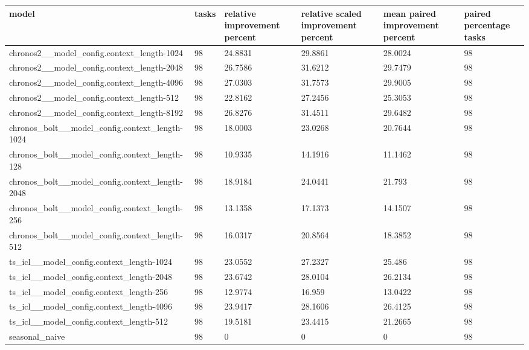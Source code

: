 \begin{tabular}{llllll}
\toprule
model & tasks & relative improvement percent & relative scaled improvement percent & mean paired improvement percent & paired percentage tasks \\
\midrule
chronos2\_\_model\_config.context\_length-1024 & 98 & 24.8831 & 29.8861 & 28.0024 & 98 \\
chronos2\_\_model\_config.context\_length-2048 & 98 & 26.7586 & 31.6212 & 29.7479 & 98 \\
chronos2\_\_model\_config.context\_length-4096 & 98 & 27.0303 & 31.7573 & 29.9005 & 98 \\
chronos2\_\_model\_config.context\_length-512 & 98 & 22.8162 & 27.2456 & 25.3053 & 98 \\
chronos2\_\_model\_config.context\_length-8192 & 98 & 26.8276 & 31.4511 & 29.6482 & 98 \\
chronos\_bolt\_\_model\_config.context\_length-1024 & 98 & 18.0003 & 23.0268 & 20.7644 & 98 \\
chronos\_bolt\_\_model\_config.context\_length-128 & 98 & 10.9335 & 14.1916 & 11.1462 & 98 \\
chronos\_bolt\_\_model\_config.context\_length-2048 & 98 & 18.9184 & 24.0441 & 21.793 & 98 \\
chronos\_bolt\_\_model\_config.context\_length-256 & 98 & 13.1358 & 17.1373 & 14.1507 & 98 \\
chronos\_bolt\_\_model\_config.context\_length-512 & 98 & 16.0317 & 20.8564 & 18.3852 & 98 \\
ts\_icl\_\_model\_config.context\_length-1024 & 98 & 23.0552 & 27.2327 & 25.486 & 98 \\
ts\_icl\_\_model\_config.context\_length-2048 & 98 & 23.6742 & 28.0104 & 26.2134 & 98 \\
ts\_icl\_\_model\_config.context\_length-256 & 98 & 12.9774 & 16.959 & 13.0422 & 98 \\
ts\_icl\_\_model\_config.context\_length-4096 & 98 & 23.9417 & 28.1606 & 26.4125 & 98 \\
ts\_icl\_\_model\_config.context\_length-512 & 98 & 19.5181 & 23.4415 & 21.2665 & 98 \\
seasonal\_naive & 98 & 0 & 0 & 0 & 98 \\
\bottomrule
\end{tabular}

